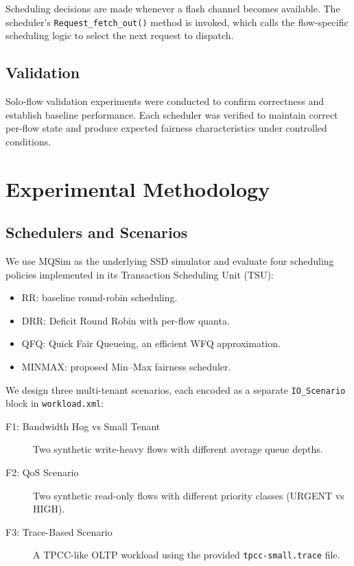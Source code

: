 \documentclass[11pt]{article}
\begin{document}
Scheduling decisions are made whenever a flash channel becomes available. The scheduler's \texttt{Request\_fetch\_out()} method is invoked, which calls the flow-specific scheduling logic to select the next request to dispatch.

\subsection{Validation}

Solo-flow validation experiments were conducted to confirm correctness and establish baseline performance. Each scheduler was verified to maintain correct per-flow state and produce expected fairness characteristics under controlled conditions.

\section{Experimental Methodology}

\subsection{Schedulers and Scenarios}

We use MQSim as the underlying SSD simulator and evaluate four scheduling
policies implemented in its Transaction Scheduling Unit (TSU):
\begin{itemize}
    \item RR: baseline round-robin scheduling.
    \item DRR: Deficit Round Robin with per-flow quanta.
    \item QFQ: Quick Fair Queueing, an efficient WFQ approximation.
    \item MINMAX: proposed Min--Max fairness scheduler.
\end{itemize}

We design three multi-tenant scenarios, each encoded as a separate
\texttt{IO\_Scenario} block in \texttt{workload.xml}:

\begin{description}
    \item[F1: Bandwidth Hog vs Small Tenant] Two synthetic write-heavy flows
    with different average queue depths.
    \item[F2: QoS Scenario] Two synthetic read-only flows with different
    priority classes (URGENT vs HIGH).
    \item[F3: Trace-Based Scenario] A TPCC-like OLTP workload using the
    provided \texttt{tpcc-small.trace} file.
\end{description}
\end{document}
